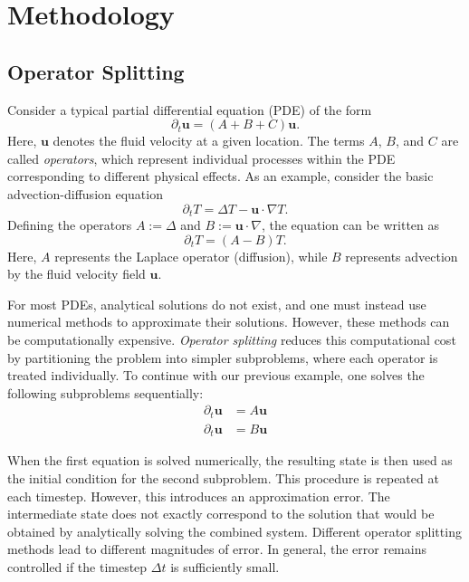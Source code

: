 \chapter{Methodology}


\section{Operator Splitting}

Consider a typical partial differential equation (PDE) of the form
$$ \partial_t \bm{u} = (A + B + C)\bm{u}. $$
Here, $\bm{u}$ denotes the fluid velocity at a given location. The terms
$A$, $B$, and $C$ are called \textit{operators}, which represent 
individual processes within the PDE corresponding to different physical 
effects. As an example, consider the basic advection-diffusion equation
$$\partial_t T = \Delta T - \bm{u} \cdot \nabla T.$$
Defining the operators $A := \Delta$ and $B := \bm{u} \cdot \nabla$, the 
equation can be written as
$$\partial_t T  = (A - B) T.$$
Here, $A$ represents the Laplace operator (diffusion), while $B$ 
represents advection by the fluid velocity field $\bm{u}$.

For most PDEs, analytical solutions do not exist, and one must instead 
use numerical methods to approximate their solutions. However, these 
methods can be computationally expensive. \textit{Operator splitting} 
reduces this computational cost by partitioning the problem into simpler
subproblems, where each operator is treated individually. To continue 
with our previous example, one solves the following subproblems 
sequentially: 
\begin{align}
\partial_t \bm{u} &= A \bm{u} \\
\partial_t \bm{u} &= B \bm{u}
\end{align}

When the first equation is solved numerically, the resulting state is then
used as the initial condition for the second subproblem. This procedure is
repeated at each timestep. However, this introduces an approximation 
error. The intermediate state does not exactly correspond to the solution
that would be obtained by analytically solving the combined system.
Different operator splitting methods lead to different magnitudes of
error. In general, the error remains controlled if the timestep $\Delta t$
is sufficiently small.

